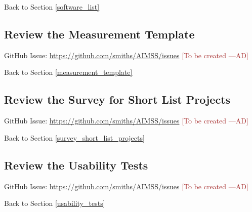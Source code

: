 \documentclass[12pt]{article}
\newcommand{\authornote}[3]{\textcolor{#1}{[#3 ---#2]}}
\newcommand{\authornote}[3]{}
\newcommand{\ad}[1]{\authornote{brown}{AD}{#1}} %
\begin{document}
\noindent Back to Section \ref{software_list}

\subsection{Review the Measurement Template}
\label{task_measurement_template}
GitHub Issue:
\href{https://github.com/smiths/AIMSS/issues}{https://github.com/smiths/AIMSS/issues}
\ad{To be created}

\noindent Back to Section \ref{measurement_template}

\subsection{Review the Survey for Short List Projects}
\label{task_survey_short_list_projects}
GitHub Issue:
\href{https://github.com/smiths/AIMSS/issues}{https://github.com/smiths/AIMSS/issues}
\ad{To be created}

\noindent Back to Section \ref{survey_short_list_projects}

\subsection{Review the Usability Tests}
\label{task_usability_tests}
GitHub Issue:
\href{https://github.com/smiths/AIMSS/issues}{https://github.com/smiths/AIMSS/issues}
\ad{To be created}

\noindent Back to Section \ref{usability_tests}
\end{document}
